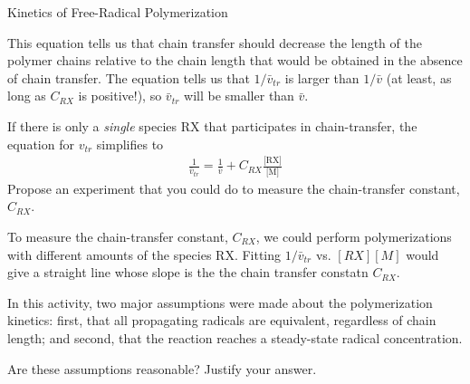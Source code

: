 \begin{activity}{Kinetics of Free-Radical Polymerization}
\begin{ctqs}
		\begin{solution}[2in]
			This equation tells us that chain transfer should decrease the length of the polymer chains relative to the chain length that would be obtained in the absence of chain transfer.  The equation tells us that $1/\bar v_{tr}$ is larger than $1/\bar v$ (at least, as long as $C_{RX}$ is positive!), so $\bar v_{tr}$ will be smaller than $\bar v$.
		\end{solution}
		
	\question If there is only a \emph{single} species RX that participates in chain-transfer, the equation for $v_{tr}$ simplifies to
	\begin{align*}
		\frac{1}{\bar v_{tr}} = \frac{1}{\bar v} + C_{RX}\frac{\text{[RX]}}{\text{[M]}}
	\end{align*}
		Propose an experiment that you could do to measure the chain-transfer constant, $C_{RX}$.
		
		\begin{solution}[2.5in]
			To measure the chain-transfer constant, $C_{RX}$, we could perform polymerizations with different amounts of the species RX.  Fitting $1/\bar v_{tr}$ vs. $[RX][M]$ would give a straight line whose slope is the the chain transfer constatn $C_{RX}$.
		\end{solution}
	
\end{ctqs}


\begin{exercises}
		
	\exercise In this activity, two major assumptions were made about the polymerization kinetics: first, that all propagating radicals are equivalent, regardless of chain length; and second, that the reaction reaches a steady-state radical concentration.
	
		Are these assumptions reasonable?  Justify your answer.
			
				\begin{solution}
\end{solution}
\end{exercises}
\end{activity}
